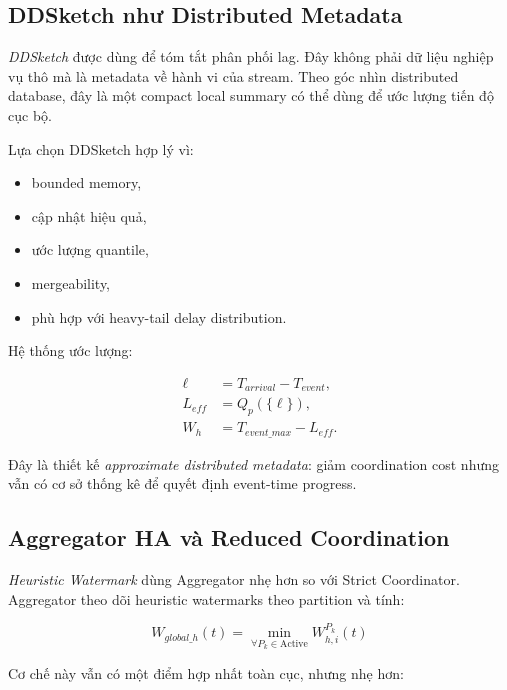 \documentclass[12pt,a4paper]{article}
\begin{document}
\subsection{DDSketch như Distributed Metadata}

\textit{DDSketch} được dùng để tóm tắt phân phối lag. Đây không phải dữ liệu nghiệp vụ thô mà là metadata về hành vi của stream. Theo góc nhìn distributed database, đây là một compact local summary có thể dùng để ước lượng tiến độ cục bộ.

Lựa chọn DDSketch hợp lý vì:

\begin{itemize}
    \item bounded memory,
    \item cập nhật hiệu quả,
    \item ước lượng quantile,
    \item mergeability,
    \item phù hợp với heavy-tail delay distribution.
\end{itemize}

Hệ thống ước lượng:

{\large
\begin{equation*}
    \boxed{\displaystyle
    \begin{aligned}
        \ell    &= T_{arrival} - T_{event}, \\
        L_{eff} &= Q_p(\{\ell\}), \\
        W_h     &= T_{event\_max} - L_{eff}.
    \end{aligned}
    }
\end{equation*}
}

Đây là thiết kế \textit{approximate distributed metadata}: giảm coordination cost nhưng vẫn có cơ sở thống kê để quyết định event-time progress.

\subsection{Aggregator HA và Reduced Coordination}

\textit{Heuristic Watermark} dùng Aggregator nhẹ hơn so với Strict Coordinator. Aggregator theo dõi heuristic watermarks theo partition và tính:

{\large
\begin{equation}
    \boxed{W_{global\_h}(t) = \min_{\forall P_k \in \text{Active}} W_{h,i}^{P_k}(t)}
\end{equation}
}

Cơ chế này vẫn có một điểm hợp nhất toàn cục, nhưng nhẹ hơn:
\end{document}
